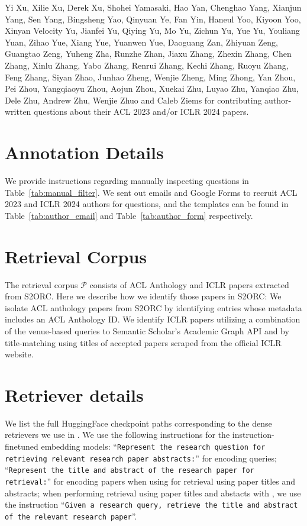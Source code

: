 Yi Xu, Xilie Xu, Derek Xu, Shohei Yamasaki, Hao Yan, Chenghao Yang, Xianjun Yang, Sen Yang, Bingsheng Yao, Qinyuan Ye, Fan Yin, Haneul Yoo, Kiyoon Yoo, Xinyan Velocity Yu, Jianfei Yu, Qiying Yu, Mo Yu, Zichun Yu, Yue Yu, Youliang Yuan, Zihao Yue, Xiang Yue, Yuanwen Yue, Daoguang Zan, Zhiyuan Zeng, Guangtao Zeng, Yuheng Zha, Runzhe Zhan, Jiaxu Zhang, Zhexin Zhang, Chen Zhang, Xinlu Zhang, Yabo Zhang, Renrui Zhang, Kechi Zhang, Ruoyu Zhang, Feng Zhang, Siyan Zhao, Junhao Zheng, Wenjie Zheng, Ming Zhong, Yan Zhou, Pei Zhou, Yangqiaoyu Zhou, Aojun Zhou, Xuekai Zhu, Luyao Zhu, Yanqiao Zhu, Dele Zhu, Andrew Zhu, Wenjie Zhuo and Caleb Ziems for contributing author-written questions about their ACL 2023 and/or ICLR 2024 papers.

\section{Annotation Details}

We provide instructions regarding manually inspecting questions in Table~\ref{tab:manual_filter}. 
We sent out emails and Google Forms to recruit ACL 2023 and ICLR 2024 authors for \authorq{} questions, and 
the templates can be found in Table~\ref{tab:author_email} and Table~\ref{tab:author_form} respectively. 

\section{Retrieval Corpus}
\label{app:corpus}

The \ours{} retrieval corpus $\mathcal{P}$ consists of ACL Anthology and ICLR papers extracted from 
S2ORC. Here we describe how we identify those papers in S2ORC:
We isolate ACL anthology papers from S2ORC by identifying entries whose metadata includes an ACL Anthology ID. We identify ICLR papers utilizing a combination of the venue-based queries to Semantic Scholar's Academic Graph API
and by title-matching using titles of accepted papers scraped from the official ICLR website. 

\section{Retriever details}
\label{app:retriever}

We list the full HuggingFace checkpoint paths corresponding to the dense retrievers we use in . 
We use the following instructions for the instruction-finetuned embedding models: ``\texttt{Represent the research question for retrieving relevant research paper abstracts:}'' for encoding queries;  ``\texttt{Represent the title and abstract of the research paper for retrieval:}'' for encoding papers when using \instructorfull{} for retrieval using paper titles and abstracts; when performing retrieval using paper titles and abstacts with \gritfull{}, we use the instruction ``\texttt{Given a research query, retrieve the title and abstract of the relevant research paper}''.

